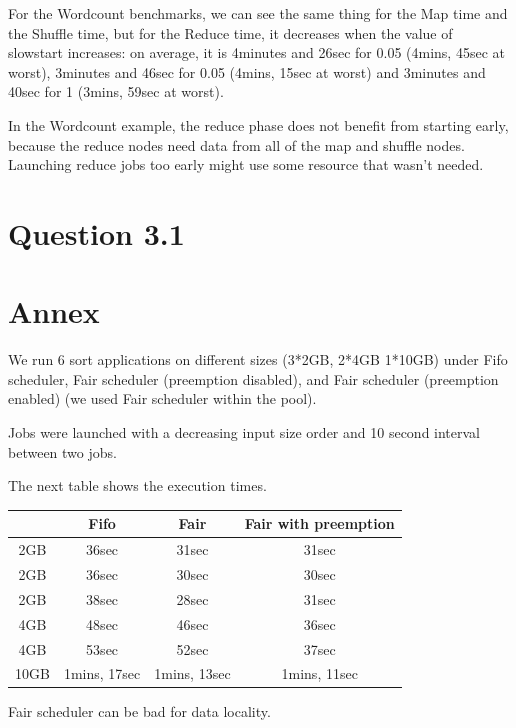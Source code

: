 \documentclass{article}
\begin{document}
For the Wordcount benchmarks, we can see the same thing for the Map time and the Shuffle time, but for the Reduce time, it decreases when the value of slowstart increases: on average, it is 4minutes and 26sec for 0.05 (4mins, 45sec at worst), 3minutes and 46sec for 0.05 (4mins, 15sec at worst) and 3minutes and 40sec for 1 (3mins, 59sec at worst).

In the Wordcount example, the reduce phase does not benefit from starting early, because the reduce nodes need data from all of the map and shuffle nodes. Launching reduce jobs too early might use some resource that wasn't needed. 

\section*{Question 3.1}

\section*{Annex}

We run 6 sort applications on different sizes (3*2GB, 2*4GB 1*10GB) under Fifo scheduler, Fair scheduler (preemption disabled), and Fair scheduler
(preemption enabled) (we used Fair scheduler within the pool).

Jobs were launched with a decreasing input size order and 10 second interval between two
jobs.


The next table shows the execution times.

\begin{center}
\begin{tabular}{|c|c|c|c|}
\hline
\ & Fifo & Fair & Fair with preemption \\
\hline
2GB & 36sec & 31sec & 31sec \\
\hline
2GB & 36sec & 30sec & 30sec \\
\hline
2GB & 38sec & 28sec & 31sec \\
\hline
4GB & 48sec & 46sec & 36sec \\
\hline
4GB & 53sec & 52sec & 37sec \\
\hline
10GB & 1mins, 17sec & 1mins, 13sec & 1mins, 11sec \\
\hline
\end{tabular}
\end{center}

Fair scheduler can be bad for data locality.
\end{document}
